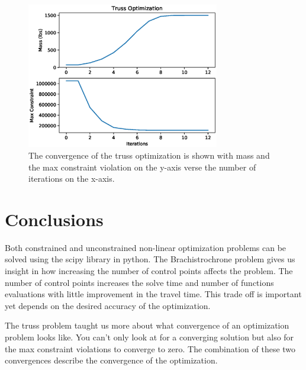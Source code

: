 \documentclass{article}
\begin{document}
\begin{figure}[htbp]
	\centering
	\includegraphics[width=0.75\textwidth]{figures/truss.eps}
	\caption{The convergence of the truss optimization is shown with mass and the max constraint violation on the y-axis verse the number of iterations on the x-axis.}
	\label{fig:truss}
\end{figure}




\section{Conclusions}

Both constrained and unconstrained non-linear optimization problems can be solved using the scipy library in python. The Brachistrochrone problem gives us insight in how increasing the number of control points affects the problem. The number of control points increases the solve time and number of functions evaluations with little improvement in the travel time. This trade off is important yet depends on the desired accuracy of the optimization.

The truss problem taught us more about what convergence of an optimization problem looks like. You can't only look at for a converging solution but also for the max constraint violations to converge to zero. The combination of these two convergences describe the convergence of the optimization.


%
%
\end{document}
